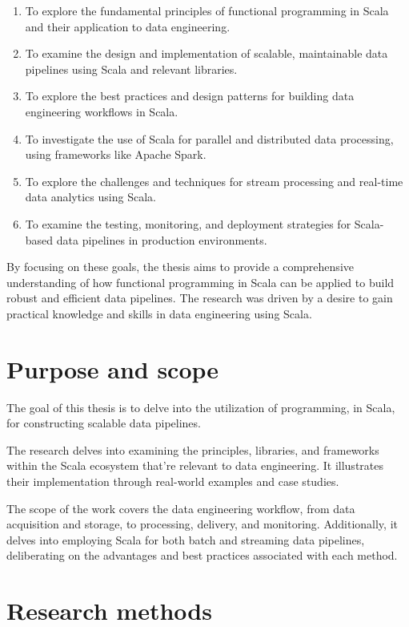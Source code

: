 \begin{enumerate}
    \item To explore the fundamental principles of functional programming in Scala and their application to data engineering.
    \item To examine the design and implementation of scalable, maintainable data pipelines using Scala and relevant libraries.
    \item To explore the best practices and design patterns for building data engineering workflows in Scala.
    \item To investigate the use of Scala for parallel and distributed data processing, using frameworks like Apache Spark.
    \item To explore the challenges and techniques for stream processing and real-time data analytics using Scala.
    \item To examine the testing, monitoring, and deployment strategies for Scala-based data pipelines in production environments.
\end{enumerate}

By focusing on these goals, the thesis aims to provide a comprehensive understanding of how functional programming in Scala can be applied to build robust and efficient data pipelines. The research was driven by a desire to gain practical knowledge and skills in data engineering using Scala.

\section*{Purpose and scope}

The goal of this thesis is to delve into the utilization of programming, in Scala, for constructing scalable data pipelines.

The research delves into examining the principles, libraries, and frameworks within the Scala ecosystem that're relevant to data engineering. It illustrates their implementation through real-world examples and case studies.

The scope of the work covers the data engineering workflow, from data acquisition and storage, to processing, delivery, and monitoring. Additionally, it delves into employing Scala for both batch and streaming data pipelines, deliberating on the advantages and best practices associated with each method.

\section*{Research methods}

